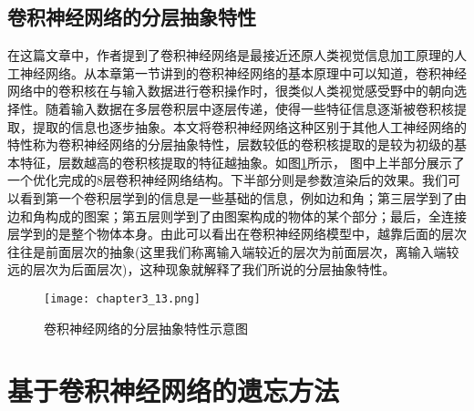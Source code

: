 \subsection{卷积神经网络的分层抽象特性}
在这篇文章\cite{2019arXiv190906161K}中，作者提到了卷积神经网络是最接近还原人类视觉信息加工原理的人工神经网络。从本章第一节讲到的卷积神经网络的基本原理中可以知道，卷积神经网络中的卷积核在与输入数据进行卷积操作时，很类似人类视觉感受野中的朝向选择性。随着输入数据在多层卷积层中逐层传递，使得一些特征信息逐渐被卷积核提取，提取的信息也逐步抽象。本文将卷积神经网络这种区别于其他人工神经网络的特性称为卷积神经网络的分层抽象特性，层数较低的卷积核提取的是较为初级的基本特征，层数越高的卷积核提取的特征越抽象。如图\ref{fig:chapter3_13}所示， 图中上半部分展示了一个优化完成的8层卷积神经网络结构。下半部分则是参数渲染后的效果。我们可以看到第一个卷积层学到的信息是一些基础的信息，例如边和角；第三层学到了由边和角构成的图案；第五层则学到了由图案构成的物体的某个部分；最后，全连接层学到的是整个物体本身。由此可以看出在卷积神经网络模型中，越靠后面的层次往往是前面层次的抽象(这里我们称离输入端较近的层次为前面层次，离输入端较远的层次为后面层次)，这种现象就解释了我们所说的分层抽象特性。
\begin{figure}
    \centering
    \texttt{[image: chapter3\_13.png]}
    \caption{卷积神经网络的分层抽象特性示意图\cite{luyujie2018}}
    \label{fig:chapter3_13}
\end{figure}

\section{基于卷积神经网络的遗忘方法}
